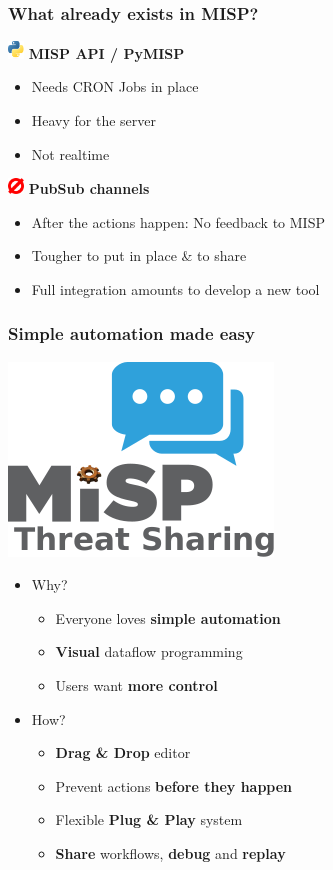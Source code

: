\begin{frame}
    \frametitle{What already exists in MISP?}
    \includegraphics[width=16px]{pictures/python-logo.png}\hspace*{0.5em} \textbf{MISP API / PyMISP}
    \begin{itemize}
        \item Needs CRON Jobs in place
        \item Heavy for the server
        \item Not realtime
    \end{itemize}
    \vspace*{1em}
    \includegraphics[width=16px]{pictures/zeromq.png}\hspace*{0.5em} \textbf{PubSub channels}
    \begin{itemize}
        \item After the actions happen: No feedback to MISP
        \item Tougher to put in place \& to share
        \item Full integration amounts to develop a new tool
    \end{itemize}
\end{frame}

\begin{frame}
    \frametitle{Simple automation made easy}
    \begin{center}
        \includegraphics[width=0.3\linewidth]{pictures/automation.png}
    \end{center}
    \begin{itemize}
        \item Why?
        \begin{itemize}
            \item Everyone loves \textbf{simple automation}
            \item \textbf{Visual} dataflow programming
            \item Users want \textbf{more control}
        \end{itemize}
        \item How?
        \begin{itemize}
            \item \textbf{Drag \& Drop} editor
            \item Prevent actions \textbf{before they happen}
            \item Flexible \textbf{Plug \& Play} system
            \item \textbf{Share} workflows, \textbf{debug} and \textbf{replay}
        \end{itemize}
    \end{itemize}
\end{frame}


